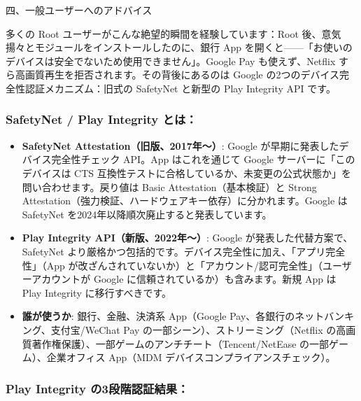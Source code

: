 四、一般ユーザーへのアドバイス


多くの Root ユーザーがこんな絶望的瞬間を経験しています：Root 後、意気揚々とモジュールをインストールしたのに、銀行 App を開くと——「お使いのデバイスは安全でないため使用できません」。Google Pay も使えず、Netflix すら高画質再生を拒否されます。その背後にあるのは Google の2つのデバイス完全性認証メカニズム：旧式の SafetyNet と新型の Play Integrity API です。

\subsubsection*{SafetyNet / Play Integrity とは：}

\begin{itemize}
  \item \textbf{SafetyNet Attestation（旧版、2017年〜）}: Google が早期に発表したデバイス完全性チェック API。App はこれを通じて Google サーバーに「このデバイスは CTS 互換性テストに合格しているか、未変更の公式状態か」を問い合わせます。戻り値は Basic Attestation（基本検証）と Strong Attestation（強力検証、ハードウェアキー依存）に分かれます。Google は SafetyNet を2024年以降順次廃止すると発表しています。
  \item \textbf{Play Integrity API（新版、2022年〜）}: Google が発表した代替方案で、SafetyNet より厳格かつ包括的です。デバイス完全性に加え、「アプリ完全性」（App が改ざんされていないか）と「アカウント/認可完全性」（ユーザーアカウントが Google に信頼されているか）も含みます。新規 App は Play Integrity に移行すべきです。
  \item \textbf{誰が使うか}: 銀行、金融、決済系 App（Google Pay、各銀行のネットバンキング、支付宝/WeChat Pay の一部シーン）、ストリーミング（Netflix の高画質著作権保護）、一部ゲームのアンチチート（Tencent/NetEase の一部ゲーム）、企業オフィス App（MDM デバイスコンプライアンスチェック）。
\end{itemize}

\subsubsection*{Play Integrity の3段階認証結果：}

